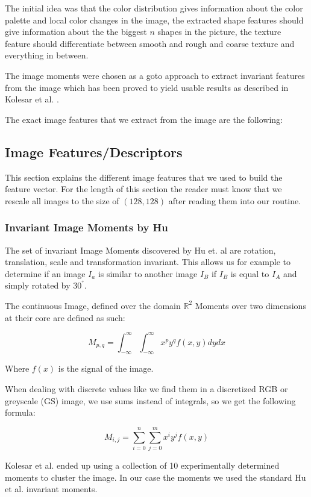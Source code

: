 \documentclass[journal]{vgtc}       %
\begin{document}
The initial idea was that the color distribution gives information about the color palette and local color changes in the image, the extracted shape features should give information about the the biggest \( n \) shapes in the picture, the texture feature should differentiate between smooth and rough and coarse texture and everything in between.

The image moments were chosen as a goto approach to extract invariant features from the image which has been proved to yield usable results as described in Kolesar et al. \cite{kolesar}.

The exact image features that we extract from the image are the following:
\subsection{Image Features/Descriptors}
This section explains the different image features that we used to build the feature vector.
For the length of this section the reader must know that we rescale all images to the size of $(128,128)$ after reading them into our routine.
\subsubsection{Invariant Image Moments by Hu}\label{subsec:humom}

The set of invariant Image Moments discovered by Hu et. al  are rotation, translation, scale and transformation  invariant. This allows us for example to determine if an image $I_a$ is similar to another image $I_B$ if $I_B$ is equal to $I_A$ and simply rotated by $30^{°}$.

The continuous  Image, defined over the domain \(\mathbb{R}^2\) Moments  over two dimensions at their core are defined as such:

\[M_{p,q} = \int^\infty_{- \infty}\int^\infty_{- \infty} x^py^q f(x,y) dy dx \]

Where \(f(x)\) is the signal of the image.  

When dealing with discrete values like we find them in a discretized RGB or greyscale (GS) image, we use sums instead of integrals, so we get the following formula:

\[M_{i,j} = \sum^n_{i=0}\sum^m_{j=0} x^i y^j f(x,y) \]

Kolesar et al. ended up using a collection of 10 experimentally determined moments to cluster the image. In our case the moments we used the standard Hu et al. invariant moments. 
\end{document}
